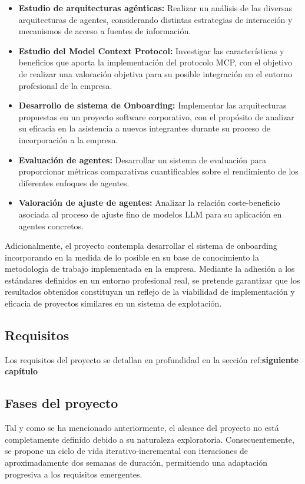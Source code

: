 \begin{itemize}
  \item\textbf{Estudio de arquitecturas agénticas: }Realizar un análisis de las diversas arquitecturas de agentes, considerando distintas estrategias de interacción y mecanismos de acceso a fuentes de información.
  \item\textbf{Estudio del Model Context Protocol: }Investigar las características y beneficios que aporta la implementación del protocolo MCP, con el objetivo de realizar una valoración objetiva para su posible integración en el entorno profesional de la empresa.
  \item\textbf{Desarrollo de sistema de Onboarding: }Implementar las arquitecturas propuestas en un proyecto software corporativo, con el propósito de analizar su eficacia en la asistencia a nuevos integrantes durante su proceso de incorporación a la empresa.
  \item\textbf{Evaluación de agentes: }Desarrollar un sistema de evaluación para proporcionar métricas comparativas cuantificables sobre el rendimiento de los diferentes enfoques de agentes. 
  \item\textbf{Valoración de ajuste de agentes: }Analizar la relación coste-beneficio asociada al proceso de ajuste fino de modelos LLM para su aplicación en agentes concretos.
\end{itemize}

Adicionalmente, el proyecto contempla desarrollar el sistema de onboarding incorporando en la medida de lo posible en su base de conocimiento la metodología de trabajo implementada en la empresa. Mediante la adhesión a los estándares definidos en un entorno profesional real, se pretende garantizar que los resultados obtenidos constituyan un reflejo de la viabilidad de implementación y eficacia de proyectos similares en un sistema de explotación. 

\subsection{Requisitos}
Los requisitos del proyecto se detallan en profundidad en la sección ref:\textbf{siguiente capítulo}

\subsection{Fases del proyecto}
Tal y como se ha mencionado anteriormente, el alcance del proyecto no está completamente definido debido a su naturaleza exploratoria. Consecuentemente, se propone un ciclo de vida iterativo-incremental con iteraciones de aproximadamente dos semanas de duración, permitiendo una adaptación progresiva a los requisitos emergentes.


